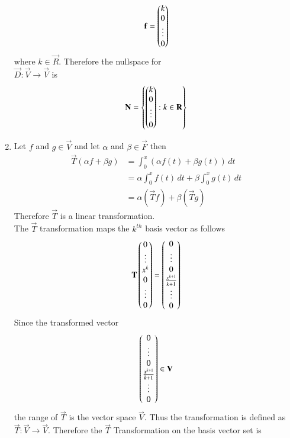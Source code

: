 \documentclass[journal,12pt,twocolumn]{IEEEtran}
\begin{document}
\begin{enumerate}[label=\emph{\alph*)}]
\begin{align}
\mathbf{f}=\begin{pmatrix}k\\0\\\vdots\\0\end{pmatrix}
\end{align}
where $k \in \vec{R}$. Therefore the nullspace for \\$\vec{D}:\vec{V}\rightarrow\vec{V}$ is
\begin{align}
	\mathbf{N}=\left\{\begin{pmatrix}k\\0\\\vdots\\0\end{pmatrix}:k \in \mathbf{R}\right\}
\end{align}
\item
Let $f$ and $g \in \vec{V}$ and let $\alpha$ and $\beta \in \vec{F}$ then
\begin{align}
	\vec{T}(\alpha f + \beta g)&=\int_{0}^{x}(\alpha f(t) + \beta g(t))\,dt\\
	&=\alpha\int_{0}^{x} f(t)\,dt+\beta\int_{0}^{x} g(t)\,dt\\
     &=\alpha(\vec{T}f)+\beta(\vec{T}g)
\end{align}
Therefore $\vec{T}$ is a linear transformation.\\
The $\vec{T}$ transformation maps the $k^{th}$ basis vector as follows
\begin{align}
      \mathbf{T}\begin{pmatrix}0\\ \vdots \\ x^k \\0 \\ \vdots \\0\end{pmatrix}
      =\begin{pmatrix}0\\ \vdots \\ 0\\ \frac{x^{k+1}}{k+1} \\ \vdots \\0\end{pmatrix}
\end{align}
Since the transformed vector
\begin{align}
	\begin{pmatrix}0\\ \vdots \\ 0\\ \frac{x^{k+1}}{k+1} \\ \vdots \\0\end{pmatrix} \in \mathbf{V}
\end{align}
the range of $\vec{T}$ is the vector space $\vec{V}$. Thus the transformation is defined as 
$\vec{T} : \vec{V}\rightarrow \vec{V}$.
Therefore the $\vec{T}$ Transformation on the basis vector set is
                \begin{align}

\end{align}
\end{enumerate}
\end{document}

